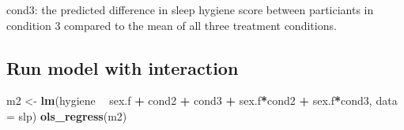 \documentclass[]{article}
\newenvironment{Shaded}{\begin{snugshade}}{\end{snugshade}}
\newcommand{\KeywordTok}[1]{\textcolor[rgb]{0.13,0.29,0.53}{\textbf{#1}}}
\newcommand{\DataTypeTok}[1]{\textcolor[rgb]{0.13,0.29,0.53}{#1}}
\newcommand{\StringTok}[1]{\textcolor[rgb]{0.31,0.60,0.02}{#1}}
\newcommand{\OperatorTok}[1]{\textcolor[rgb]{0.81,0.36,0.00}{\textbf{#1}}}
\newcommand{\NormalTok}[1]{#1}
\begin{document}
cond3: the predicted difference in sleep hygiene score between
particiants in condition 3 compared to the mean of all three treatment
conditions.

\subsection{Run model with
interaction}\label{run-model-with-interaction-1}

\begin{Shaded}
\begin{Highlighting}[]
\NormalTok{m2 <-}\StringTok{ }\KeywordTok{lm}\NormalTok{(hygiene }\OperatorTok{~}\StringTok{ }\NormalTok{sex.f }\OperatorTok{+}\StringTok{ }\NormalTok{cond2 }\OperatorTok{+}\StringTok{ }\NormalTok{cond3 }\OperatorTok{+}\StringTok{ }\NormalTok{sex.f}\OperatorTok{*}\NormalTok{cond2 }\OperatorTok{+}\StringTok{ }\NormalTok{sex.f}\OperatorTok{*}\NormalTok{cond3, }\DataTypeTok{data =}\NormalTok{ slp)}
\KeywordTok{ols_regress}\NormalTok{(m2)}
\end{Highlighting}
\end{Shaded}
\end{document}
